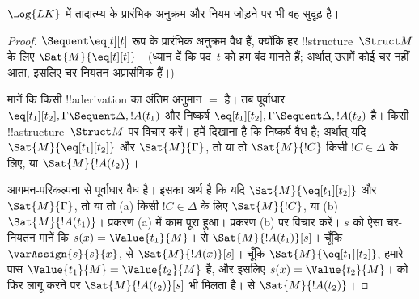 \documentclass[../../../include/open-logic-section]{subfiles}
\begin{document}


\begin{prop}
$\Log{LK}$ में तादात्म्य के प्रारंभिक अनुक्रम और नियम जोड़ने पर भी वह सुदृढ़ है।
\end{prop}

\begin{proof}
${} \Sequent \eq[t][t]$ रूप के प्रारंभिक अनुक्रम वैध हैं, क्योंकि हर
!!{structure}~$\Struct M$ के लिए $\Sat{M}{\eq[t][t]}$। (ध्यान दें कि पद~$t$
को हम बंद मानते हैं; अर्थात् उसमें कोई चर नहीं आता, इसलिए चर-नियतन अप्रासंगिक
हैं।)

मानें कि किसी !!a{derivation} का अंतिम अनुमान $=$ है। तब पूर्वाधार
$\eq[t_1][t_2], \Gamma \Sequent \Delta, !A(t_1)$ और निष्कर्ष
$\eq[t_1][t_2], \Gamma \Sequent \Delta, !A(t_2)$ है। किसी
!!a{structure}~$\Struct M$ पर विचार करें। हमें दिखाना है कि निष्कर्ष वैध है;
अर्थात् यदि $\Sat{M}{\eq[t_1][t_2]}$ और $\Sat{M}{\Gamma}$, तो या तो
$\Sat{M}{!C}$ किसी $!C \in \Delta$ के लिए, या $\Sat{M}{!A(t_2)}$।

आगमन-परिकल्पना से पूर्वाधार वैध है। इसका अर्थ है कि यदि
$\Sat{M}{\eq[t_1][t_2]}$ और $\Sat{M}{\Gamma}$, तो या तो (a) किसी $!C
\in \Delta$ के लिए $\Sat{M}{!C}$, या (b) $\Sat{M}{!A(t_1)}$। प्रकरण (a)
में काम पूरा हुआ। प्रकरण (b) पर विचार करें। $s$ को ऐसा चर-नियतन मानें कि
$s(x) = \Value{t_1}{M}$।  से
$\Sat{M}{!A(t_1)}[s]$। चूँकि $\varAssign{s}{s}{x}$,
 से $\Sat{M}{!A(x)}[s]$। चूँकि
$\Sat{M}{\eq[t_1][t_2]}$, हमारे पास $\Value{t_1}{M} = \Value{t_2}{M}$ है,
और इसलिए $s(x) = \Value{t_2}{M}$।  को
फिर लागू करने पर $\Sat{M}{!A(t_2)}[s]$ भी मिलता है।
 से $\Sat{M}{!A(t_2)}$।
\end{proof}
\end{document}
